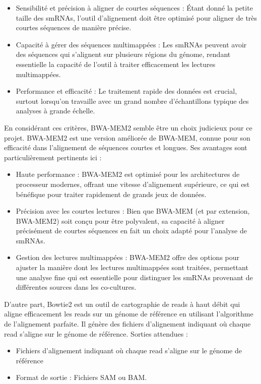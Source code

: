\documentclass{report}
\begin{document}
\begin{itemize}
    \item Sensibilité et précision à aligner de courtes séquences : Étant donné la petite taille des smRNAs, l'outil d'alignement doit être optimisé pour aligner de très courtes séquences de manière précise.
    \item Capacité à gérer des séquences multimappées : Les smRNAs peuvent avoir des séquences qui s'alignent sur plusieurs régions du génome, rendant essentielle la capacité de l'outil à traiter efficacement les lectures multimappées.
    \item Performance et efficacité : Le traitement rapide des données est crucial, surtout lorsqu'on travaille avec un grand nombre d'échantillons typique des analyses à grande échelle.
\end{itemize} \vspace{.5cm}

En considérant ces critères, BWA-MEM2\cite{bwamem2} semble être un choix judicieux pour ce projet. BWA-MEM2 est une version améliorée de BWA-MEM, connue pour son efficacité dans l'alignement de séquences courtes et longues. Ses avantages sont particulièrement pertinents ici :

\begin{itemize}
    \item Haute performance : BWA-MEM2 est optimisé pour les architectures de processeur modernes, offrant une vitesse d'alignement supérieure, ce qui est bénéfique pour traiter rapidement de grands jeux de données.
    \item Précision avec les courtes lectures : Bien que BWA-MEM (et par extension, BWA-MEM2) soit conçu pour être polyvalent, sa capacité à aligner précisément de courtes séquences en fait un choix adapté pour l'analyse de smRNAs.
    \item Gestion des lectures multimappées : BWA-MEM2 offre des options pour ajuster la manière dont les lectures multimappées sont traitées, permettant une analyse fine qui est essentielle pour distinguer les smRNAs provenant de différentes sources dans les co-cultures.
\end{itemize} \vspace{.5cm}

D'autre part,   Bowtie2 \cite{bowtie2} est un outil de cartographie de reads à haut débit qui aligne efficacement les reads sur un génome de référence en utilisant l'algorithme de l'alignement parfaite. Il génère des fichiers d'alignement indiquant où chaque read s'aligne sur le génome de référence.
Sorties attendues :
\begin{itemize}
    \item Fichiers d'alignement indiquant où chaque read s'aligne sur le génome de référence
    \item Format de sortie : Fichiers SAM ou BAM.
\end{itemize} \vspace{.5cm}
\end{document}

